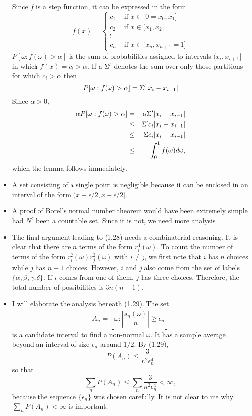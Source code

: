 \begin{itemize}
Since $f$ is a step function, it can be expressed in the form
\[
f(x) = \begin{cases} c_1 & \text{ if } x \in (0=x_0, x_1] \\
c_2 & \text{ if } x \in (x_1, x_2] \\
\vdots \\
c_n & \text{ if } x \in (x_n, x_{n+1}=1]
\end{cases}
\]
$P[\omega: f(\omega) > \alpha]$ is the sum of probabilities assigned to 
intervals $(x_i, x_{i + 1}]$ in which $f(x) = c_i > \alpha$. If a $\Sigma^\prime$
denotes the sum over only those partitions for which $c_i > \alpha$ then
\[
P[\omega: f(\omega) > \alpha] = \Sigma^\prime |x_i - x_{i-1}|
\]
Since $\alpha > 0$,
\begin{eqnarray*}
\alpha P[\omega: f(\omega) > \alpha] &=& \alpha \Sigma^\prime |x_i - x_{i-1}| \\
 &\le& \Sigma^\prime c_i |x_i - x_{i-1}| \\
 &\le& \Sigma c_i |x_i - x_{i-1}| \\ 
 &\le& \int_0^1 f(\omega)d\omega,
\end{eqnarray*}
which the lemma follows immediately.

\item A set consisting of a single point is negligible because it can be 
enclosed in an interval of the form $(x - \epsilon/2, x + \epsilon/2]$.

\item A proof of Borel's normal number theorem would have been extremely simple
had $N^c$ been a countable set. Since it is not, we need more analysis.

\item The final argument leading to (1.28) needs a combinatorial reasoning. It
is clear that there are $n$ terms of the form $r_i^4(\omega)$. To count the
number of terms of the form $r_i^2(\omega)r_j^2(\omega)$ with $i \ne j$, we 
first note that $i$ has $n$ choices while $j$ has $n - 1$ choices. However, $i$
and $j$ also come from the set of labels $\{\alpha, \beta, \gamma, \delta\}$. If
$i$ comes from one of them, $j$ has three choices. Therefore, the total number
of possibilities is $3n(n - 1)$.

\item I will elaborate the analysis beneath (1.29). The set
\[
A_n = \left[\omega: \left|\frac{s_n(\omega)}{n}\right| \ge \epsilon_n\right]
\]
is a candidate interval to find a non-normal $\omega$. It has a sample average
beyond an interval of size $\epsilon_n$ around $1/2$. By (1.29),
\[
P(A_n) \le \frac{3}{n^2\epsilon_n^4}
\]
so that
\[
\sum_{n}P(A_n) \le \sum_n\frac{3}{n^2\epsilon_n^4} < \infty,
\]
because the sequence $\{\epsilon_n\}$ was chosen carefully. It is not clear to
me why $\sum_n P(A_n) < \infty$ is important.


\end{itemize}
